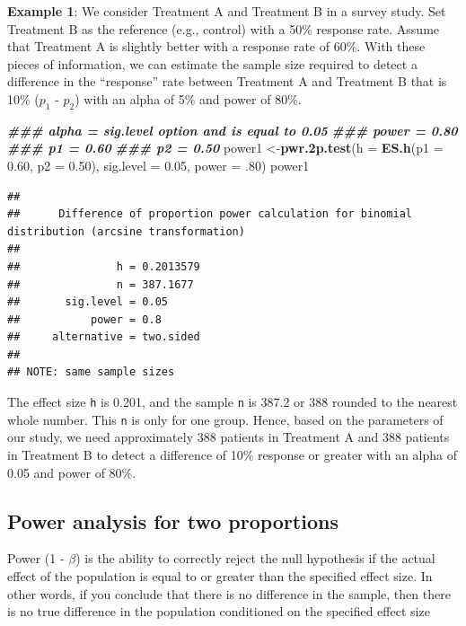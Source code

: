 \documentclass[
]{book}
\newenvironment{Shaded}{\begin{snugshade}}{\end{snugshade}}
\newcommand{\AttributeTok}[1]{\textcolor[rgb]{0.13,0.29,0.53}{#1}}
\newcommand{\DecValTok}[1]{\textcolor[rgb]{0.00,0.00,0.81}{#1}}
\newcommand{\DocumentationTok}[1]{\textcolor[rgb]{0.56,0.35,0.01}{\textbf{\textit{#1}}}}
\newcommand{\FloatTok}[1]{\textcolor[rgb]{0.00,0.00,0.81}{#1}}
\newcommand{\FunctionTok}[1]{\textcolor[rgb]{0.13,0.29,0.53}{\textbf{#1}}}
\newcommand{\NormalTok}[1]{#1}
\newcommand{\OtherTok}[1]{\textcolor[rgb]{0.56,0.35,0.01}{#1}}
\begin{document}
\textbf{Example 1}: We consider Treatment A and Treatment B in a survey study. Set Treatment B as the reference (e.g., control) with a 50\% response rate. Assume that Treatment A is slightly better with a response rate of 60\%. With these pieces of information, we can estimate the sample size required to detect a difference in the ``response'' rate between Treatment A and Treatment B that is 10\% (\(p_{1}\) - \(p_{2}\)) with an alpha of 5\% and power of 80\%.

\begin{Shaded}
\begin{Highlighting}[]
\DocumentationTok{\#\#\# alpha = sig.level option and is equal to 0.05}
\DocumentationTok{\#\#\# power = 0.80}
\DocumentationTok{\#\#\# p1 = 0.60 }
\DocumentationTok{\#\#\# p2 = 0.50}
\NormalTok{power1 }\OtherTok{\textless{}{-}}\FunctionTok{pwr.2p.test}\NormalTok{(}\AttributeTok{h =} \FunctionTok{ES.h}\NormalTok{(}\AttributeTok{p1 =} \FloatTok{0.60}\NormalTok{, }\AttributeTok{p2 =} \FloatTok{0.50}\NormalTok{), }\AttributeTok{sig.level =} \FloatTok{0.05}\NormalTok{, }\AttributeTok{power =}\NormalTok{ .}\DecValTok{80}\NormalTok{)}
\NormalTok{power1}
\end{Highlighting}
\end{Shaded}

\begin{verbatim}
## 
##      Difference of proportion power calculation for binomial distribution (arcsine transformation) 
## 
##               h = 0.2013579
##               n = 387.1677
##       sig.level = 0.05
##           power = 0.8
##     alternative = two.sided
## 
## NOTE: same sample sizes
\end{verbatim}

The effect size \texttt{h} is 0.201, and the sample \texttt{n} is 387.2 or 388 rounded to the nearest whole number. This \texttt{n} is only for one group. Hence, based on the parameters of our study, we need approximately 388 patients in Treatment A and 388 patients in Treatment B to detect a difference of 10\% response or greater with an alpha of 0.05 and power of 80\%.

\hypertarget{power-analysis-for-two-proportions}{%
\subsection{\texorpdfstring{Power analysis for \textbf{two proportions}}{Power analysis for two proportions}}\label{power-analysis-for-two-proportions}}

Power (1 - \(\beta\)) is the ability to correctly reject the null hypothesis if the actual effect of the population is equal to or greater than the specified effect size. In other words, if you conclude that there is no difference in the sample, then there is no true difference in the population conditioned on the specified effect size
\end{document}
